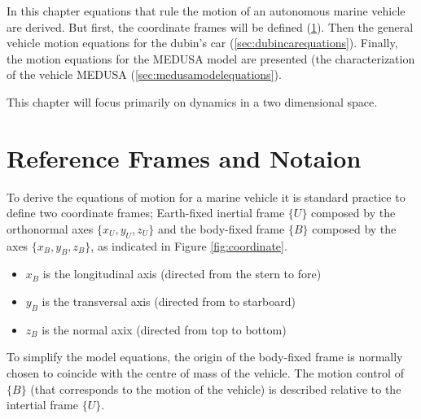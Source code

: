\cleardoublepage
\label{chap:autonomousvehiclemodels}

\par In this chapter equations that rule the motion of an autonomous marine vehicle are derived. But first, the coordinate frames will be defined (\ref{sec:refframes}). Then the general vehicle motion equations for the dubin's car (\ref{sec:dubincarequations}). Finally, the motion equations for the MEDUSA model are presented (the characterization of the vehicle MEDUSA (\ref{sec:medusamodelequations}). 
\par This chapter will focus primarily on dynamics in a two dimensional space.

\section{Reference Frames and Notaion}
\label{sec:refframes}


\par To derive the equations of motion for a marine vehicle it is standard practice to define two coordinate frames; Earth-fixed inertial frame $\{U\}$ composed by the orthonormal axes $\{x_U,y_U,z_U\}$ and the body-fixed frame $\{B\}$ composed by the axes $\{x_B,y_B,z_B\}$, as indicated in Figure \ref{fig:coordinate}.

\begin{itemize}
    \item $x_B$ is the longitudinal axis (directed from the stern to fore)
    \item $y_B$ is the transversal axis (directed from to starboard)
    \item $z_B$ is the normal axix (directed from top to bottom)
\end{itemize}

\par To simplify the model equations, the origin of the body-fixed frame is normally chosen to coincide with the centre of mass of the vehicle. The motion control of $\{B\}$ (that corresponds to the motion of the vehicle) is described relative to the intertial frame $\{U\}$.

